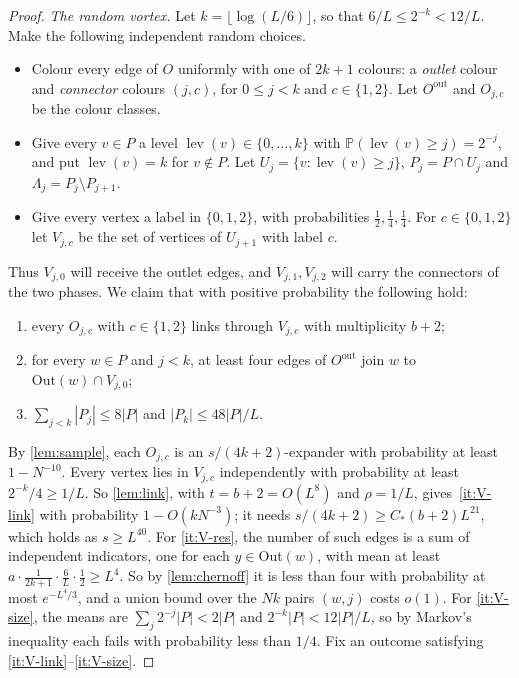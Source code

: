 \documentclass[11pt]{article}
\theoremstyle{definition}
\theoremstyle{remark}
\numberwithin{equation}{section}
\numberwithin{figure}{section}
\numberwithin{table}{section}
\renewcommand{\Pr}{\mathbb{P}}
\DeclareMathOperator{\lev}{lev}
\begin{document}
\begin{proof}
\emph{The random vortex.} Let $k=\lfloor\log(L/6)\rfloor$, so that
$6/L\le2^{-k}<12/L$. Make the following independent random choices.
\begin{itemize}[leftmargin=2em,itemsep=1pt]
\item Colour every edge of $O$ uniformly with one of $2k+1$ colours: a
\emph{outlet} colour and \emph{connector} colours $(j,c)$, for $0\le j<k$ and
$c\in\{1,2\}$. Let $O^{\mathrm{out}}$ and $O_{j,c}$ be the colour classes.
\item Give every $v\in P$ a level $\lev(v)\in\{0,\dots,k\}$ with
$\Pr(\lev(v)\ge j)=2^{-j}$, and put $\lev(v)=k$ for $v\notin P$. Let
$U_j=\{v:\lev(v)\ge j\}$, $P_j=P\cap U_j$ and $\Lambda_j=P_j\setminus P_{j+1}$.
\item Give every vertex a label in $\{0,1,2\}$, with probabilities
$\frac12,\frac14,\frac14$. For $c\in\{0,1,2\}$ let $V_{j,c}$ be the set of
vertices of $U_{j+1}$ with label $c$.
\end{itemize}
Thus $V_{j,0}$ will receive the outlet edges, and $V_{j,1},V_{j,2}$ will
carry the connectors of the two phases. We claim that with positive
probability the following hold:
\begin{enumerate}[label=(V\arabic*),itemsep=1pt]
\item\label{it:V-link} every $O_{j,c}$ with $c\in\{1,2\}$ links through
$V_{j,c}$ with multiplicity $b+2$;
\item\label{it:V-res} for every $w\in P$ and $j<k$, at least four edges of
$O^{\mathrm{out}}$ join $w$ to $\mathrm{Out}(w)\cap V_{j,0}$;
\item\label{it:V-size} $\sum_{j<k}|P_j|\le8|P|$ and $|P_k|\le48|P|/L$.
\end{enumerate}
By \cref{lem:sample}, each $O_{j,c}$ is an $s/(4k+2)$-expander with
probability at least $1-N^{-10}$. Every vertex lies in $V_{j,c}$ independently
with probability at least $2^{-k}/4\ge1/L$. So \cref{lem:link}, with
$t=b+2=O(L^8)$ and $\rho=1/L$, gives~\ref{it:V-link} with probability
$1-O(kN^{-3})$; it needs $s/(4k+2)\ge C_*(b+2)L^{21}$, which holds as
$s\ge L^{40}$. For \ref{it:V-res}, the number of such edges is a sum of
independent indicators, one for each $y\in\mathrm{Out}(w)$, with mean at least
$a\cdot\frac1{2k+1}\cdot\frac6L\cdot\frac12\ge L^4$. So by \cref{lem:chernoff}
it is less than four with probability at most $e^{-L^4/3}$, and a union bound
over the $Nk$ pairs $(w,j)$ costs $o(1)$. For \ref{it:V-size}, the means are
$\sum_j2^{-j}|P|<2|P|$ and $2^{-k}|P|<12|P|/L$, so by Markov's inequality each
fails with probability less than $1/4$. Fix an outcome satisfying
\ref{it:V-link}--\ref{it:V-size}.


\end{proof}
\end{document}
